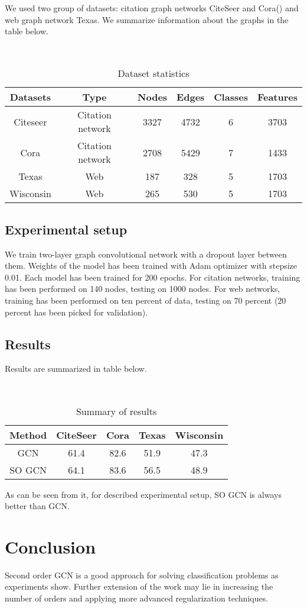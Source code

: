 \documentclass{article}
\begin{document}
We used two group of datasets: citation graph networks CiteSeer and Cora(\cite{Sen}) and web graph network Texas. We summarize information about the graphs in the table below.
\begin{table}[h]
\centering
\caption{Dataset statistics}
~\\
\begin{tabular}{c c c c c c}
{\bf Datasets} & {\bf Type} & {\bf Nodes} & {\bf Edges} & {\bf Classes} & {\bf Features}\\
\hline
Citeseer & Citation network & 3327 & 4732 & 6 & 3703\\
Cora & Citation network & 2708 & 5429 & 7 & 1433 \\
Texas & Web & 187 & 328 & 5 & 1703\\
Wisconsin & Web & 265 & 530 & 5 & 1703 \\
\end{tabular}
\end{table}

\subsection{Experimental setup}

We train two-layer graph convolutional network with a dropout layer between them. Weights of the model has been trained with Adam optimizer with stepsize 0.01. Each model has been trained for 200 epochs. For citation networks, training has been performed on 140 nodes, testing on 1000 nodes. For web networks, training has been performed on ten percent of data, testing on 70 percent (20 percent has been picked for validation).

\subsection{Results}

Results are summarized in table below.

\begin{table}[h]
\centering
\caption{Summary of results} 
~\\
\begin{tabular}{c c c c c}
{\bf Method} & {\bf CiteSeer} & {\bf Cora} & {\bf Texas} & {\bf Wisconsin}\\
\hline
GCN & 61.4 & 82.6 & 51.9 & 47.3\\
SO GCN & 64.1 & 83.6 & 56.5 & 48.9\\
\end{tabular}
\end{table}

As can be seen from it, for described experimental setup, SO GCN is always better than GCN. 

\section{Conclusion}

Second order GCN is a good approach for solving classification problems as experiments show. Further extension of the work may lie in increasing the number of orders and applying more advanced regularization techniques.



\end{document}
